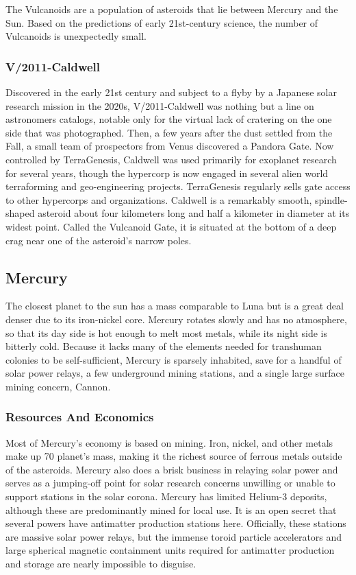 The Vulcanoids are a population of asteroids that lie 
between Mercury and the Sun. Based on the predictions
of early 21st-century science, the number of
Vulcanoids is unexpectedly small.

\subsubsection{V/2011-Caldwell}

Discovered in the early 21st century and subject to 
a flyby by a Japanese solar research mission in the 
2020s, V/2011-Caldwell was nothing but a line on astronomers
catalogs, notable only for the virtual lack
of cratering on the one side that was photographed. 
Then, a few years after the dust settled from the Fall, 
a small team of prospectors from Venus discovered 
a Pandora Gate. Now controlled by TerraGenesis, 
Caldwell was used primarily for exoplanet research 
for several years, though the hypercorp is now 
engaged in several alien world terraforming and 
geo-engineering projects. TerraGenesis regularly sells 
gate access to other hypercorps and organizations. 
Caldwell is a remarkably smooth, spindle-shaped asteroid
about four kilometers long and half a kilometer
in diameter at its widest point. Called the Vulcanoid 
Gate, it is situated at the bottom of a deep crag near 
one of the asteroid's narrow poles.

\subsection{Mercury}

The closest planet to the sun has a mass comparable 
to Luna but is a great deal denser due to its iron-nickel 
core. Mercury rotates slowly and has no atmosphere, 
so that its day side is hot enough to melt most metals, 
while its night side is bitterly cold. Because it lacks 
many of the elements needed for transhuman colonies 
to be self-sufficient, Mercury is sparsely inhabited, 
save for a handful of solar power relays, a few underground
mining stations, and a single large surface
mining concern, Cannon.

\subsubsection{Resources And Economics}

Most of Mercury's economy is based on mining. 
Iron, nickel, and other metals make up 70%
planet's mass, making it the richest source of ferrous 
metals outside of the asteroids. Mercury also does a 
brisk business in relaying solar power and serves as a 
jumping-off point for solar research concerns unwilling
or unable to support stations in the solar corona.
Mercury has limited Helium-3 deposits, although these 
are predominantly mined for local use. It is an open 
secret that several powers have antimatter production 
stations here. Officially, these stations are massive 
solar power relays, but the immense toroid particle 
accelerators and large spherical magnetic containment 
units required for antimatter production and storage 
are nearly impossible to disguise.

